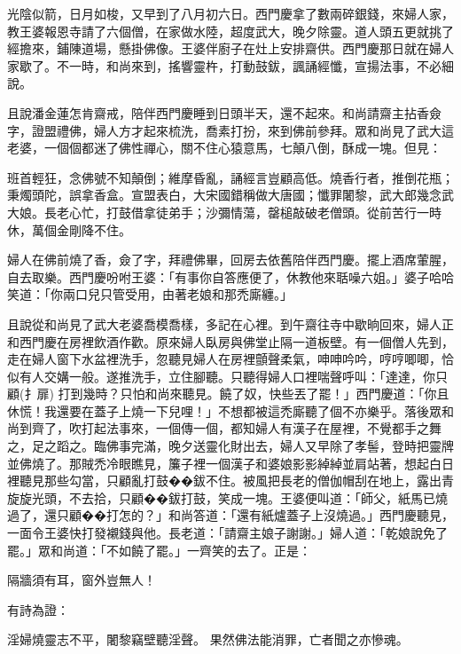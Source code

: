 \begin{showcontents}{}
光陰似箭，日月如梭，又早到了八月初六日。西門慶拿了數兩碎銀錢，來婦人家，教王婆報恩寺請了六個僧，在家做水陸，超度武大，晚夕除靈。道人頭五更就挑了經擔來，鋪陳道場，懸掛佛像。王婆伴廚子在灶上安排齋供。西門慶那日就在婦人家歇了。不一時，和尚來到，搖響靈杵，打動鼓鈸，諷誦經懺，宣揚法事，不必細說。

且說潘金蓮怎肯齋戒，陪伴西門慶睡到日頭半天，還不起來。和尚請齋主拈香僉字，證盟禮佛，婦人方才起來梳洗，喬素打扮，來到佛前參拜。眾和尚見了武大這老婆，一個個都迷了佛性禪心，關不住心猿意馬，七顛八倒，酥成一塊。但見：

班首輕狂，念佛號不知顛倒；維摩昏亂，誦經言豈顧高低。燒香行者，推倒花瓶；秉燭頭陀，誤拿香盒。宣盟表白，大宋國錯稱做大唐國；懺罪闍黎，武大郎幾念武大娘。長老心忙，打鼓借拿徒弟手；沙彌情蕩，罄槌敲破老僧頭。從前苦行一時休，萬個金剛降不住。

婦人在佛前燒了香，僉了字，拜禮佛畢，回房去依舊陪伴西門慶。擺上酒席葷腥，自去取樂。西門慶吩咐王婆：「有事你自答應便了，休教他來聒噪六姐。」婆子哈哈笑道：「你兩口兒只管受用，由著老娘和那禿廝纏。」

且說從和尚見了武大老婆喬模喬樣，多記在心裡。到午齋往寺中歇晌回來，婦人正和西門慶在房裡飲酒作歡。原來婦人臥房與佛堂止隔一道板壁。有一個僧人先到，走在婦人窗下水盆裡洗手，忽聽見婦人在房裡顫聲柔氣，呻呻吟吟，哼哼唧唧，恰似有人交媾一般。遂推洗手，立住腳聽。只聽得婦人口裡喘聲呼叫：「達達，你只顧(扌扉) 打到幾時？只怕和尚來聽見。饒了奴，快些丟了罷！」西門慶道：「你且休慌！我還要在蓋子上燒一下兒哩！」不想都被這禿廝聽了個不亦樂乎。落後眾和尚到齊了，吹打起法事來，一個傳一個，都知婦人有漢子在屋裡，不覺都手之舞之，足之蹈之。臨佛事完滿，晚夕送靈化財出去，婦人又早除了孝髻，登時把靈牌並佛燒了。那賊禿冷眼瞧見，簾子裡一個漢子和婆娘影影綽綽並肩站著，想起白日裡聽見那些勾當，只顧亂打鼓��鈸不住。被風把長老的僧伽帽刮在地上，露出青旋旋光頭，不去拾，只顧��鈸打鼓，笑成一塊。王婆便叫道：「師父，紙馬已燒過了，還只顧��打怎的？」和尚答道：「還有紙爐蓋子上沒燒過。」西門慶聽見，一面令王婆快打發襯錢與他。長老道：「請齋主娘子謝謝。」婦人道：「乾娘說免了罷。」眾和尚道：「不如饒了罷。」一齊笑的去了。正是：

隔牆須有耳，窗外豈無人！

有詩為證：

淫婦燒靈志不平，闍黎竊壁聽淫聲。
果然佛法能消罪，亡者聞之亦慘魂。






\end{showcontents}


